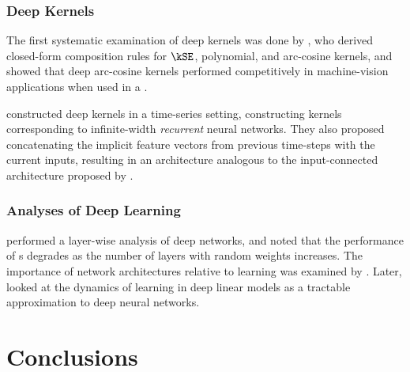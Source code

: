 \subsubsection{Deep Kernels}

The first systematic examination of deep kernels was done by \citet{cho2009kernel}, who derived closed-form composition rules for $\kSE$, polynomial, and arc-cosine kernels, and showed that deep arc-cosine kernels performed competitively in machine-vision applications when used in a \SVM{}.

\cite{hermans2012recurrent} constructed deep kernels in a time-series setting, constructing kernels corresponding to infinite-width \emph{recurrent} neural networks.
They also proposed concatenating the implicit feature vectors from previous time-steps with the current inputs, resulting in an architecture analogous to the input-connected architecture proposed by \citet{neal1995bayesian}.

\subsubsection{Analyses of Deep Learning}
\cite{montavon2010layer} performed a layer-wise analysis of deep networks, and noted that the performance of \MLP{}s degrades as the number of layers with random weights increases.
The importance of network architectures relative to learning was examined by \cite{saxe2011random}.
Later, \cite{saxedynamics} looked at the dynamics of learning in deep linear models as a tractable approximation to deep neural networks.  








\section{Conclusions}

